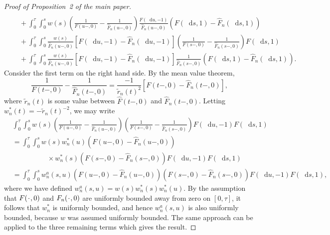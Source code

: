 \documentclass[11pt]{article}
\theoremstyle{thmstyleone}%
\theoremstyle{thmstyletwo}%
\theoremstyle{thmstylethree}%
\newcommand{\blank}{\makebox[1ex]{\textbf{$\cdot$}}}
\newcommand*\diff{\mathop{}\!\mathrm{d}}
\newcommand{\1}{\mathds{1}}
\begin{document}
\begin{proof}[Proof of Proposition~2 of the main paper]
\begin{align*}
      \\
      & \quad +
        \int_0^{\tau}
        \int_0^s
        w(s) 
        \left(
        \frac{1}{F(u-, 0)} -  \frac{1}{\hat{F}_n(u-, 0)}
        \right) \frac{F(\diff u, -1) }{\hat{F}_n(u-,0)}
        \left(
        F(\diff s, 1) -
        \hat{F}_n(\diff s, 1)
        \right)
      \\
      & \quad +
        \int_0^{\tau} 
        \int_0^s      
        \frac{w(s) }{\hat{F}_n(u-, 0)} 
        \left[
        F(\diff u, -1) - \hat{F}_n(\diff u, -1)
        \right]
        \left(
        \frac{1}{F(s-, 0)} -
        \frac{1}{\hat{F}_n(s-, 0)}
        \right)F(\diff s, 1)
      \\
      & \quad +
        \int_0^{\tau} 
        \int_0^s      
        \frac{w(s) }{\hat{F}_n(u-, 0)} 
        \left[
        F(\diff u, -1) - \hat{F}_n(\diff u, -1)
        \right]
        \frac{1}{\hat{F}_n(s-, 0)}
        \left(
        F(\diff s, 1) -
        \hat{F}_n(\diff s, 1)
        \right).
    \end{align*}
    \endgroup %
    Consider the first term on the right hand side. By the mean value theorem,
    \begin{equation*}
      \frac{1}{F(t-, 0)}
      - \frac{1}{\hat{F}_n(t-, 0)}
      = \frac{-1}{\tilde{r}_n(t)^2}
      \left[
        F(t-, 0)
        - \hat{F}_n(t-, 0)
      \right],
    \end{equation*}
    where \( \tilde{r}_n(t) \) is some value between \( \hat{F}(t-, 0) \) and
    \( \hat{F}_n(t-, 0) \). Letting \( w_n^*(t) = -\tilde{r}_n(t)^{-2} \), we
    may write
  \begin{align*}
    & \int_0^{\tau} 
      \int_0^s
      w(s) 
      \left(
      \frac{1}{F(u-, 0)} -  \frac{1}{\hat{F}_n(u-, 0)}
      \right)      
      \left(
      \frac{1}{F(s-, 0)} -
      \frac{1}{\hat{F}_n(s-, 0)}
      \right)F(\diff u, -1)F(\diff s, 1)
    \\
    & =
      \int_0^{\tau} 
      \int_0^s
      w(s)
      w_n^*(u) 
      \left(
      F(u-, 0) - \hat{F}_n(u-, 0)
      \right)
    \\
    & \qquad \qquad \quad
      \times
      w_n^*(s) 
      \left(
      F(s-, 0) - \hat{F}_n(s-, 0)
      \right)       
      F(\diff u, -1)F(\diff s, 1)
    \\
    & =
      \int_0^{\tau} 
      \int_0^s
      w_n^a(s,u)
      \left(
      F(u-, 0) - \hat{F}_n(u-, 0)
      \right)
      \left(
      F(s-, 0) - \hat{F}_n(s-, 0)
      \right)       
      F(\diff u, -1)F(\diff s, 1),
  \end{align*}
  where we have defined \( w_n^a(s,u) = w(s)w^*_n(s)w^*_n(u) \). By the
  assumption that \( F(\blank,0) \) and \( F_n(\blank,0) \) are uniformly
  bounded away from zero on \( [0,\tau] \), it follows that \( w_n^* \) is
  uniformly bounded, and hence \( w_n^a(s,u) \) is also uniformly bounded,
  because \( w \) was assumed uniformly bounded. The same approach can be
  applied to the three remaining terms which gives the result.
\end{proof}


\end{document}
